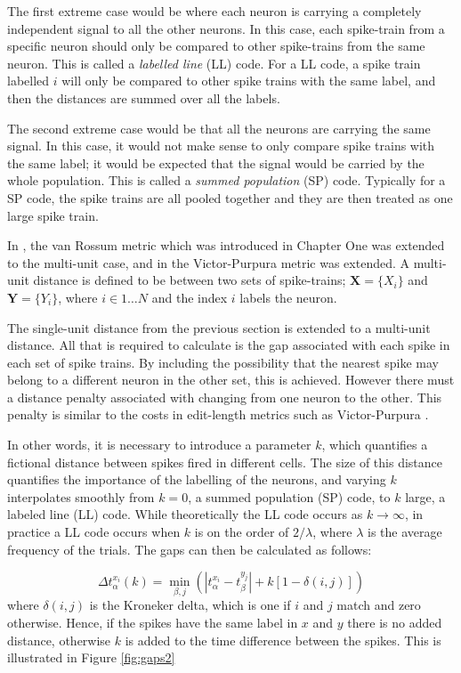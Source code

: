 The first extreme case would be where each neuron is carrying a completely independent signal to all the other neurons.  In this case, each spike-train from a specific neuron should only be compared to other spike-trains from the same neuron.  This is called a \emph{labelled line} (LL) code.  For a LL code, a spike train labelled $i$ will only be compared to other spike trains with the same label, and then the distances are summed over all the labels.

The second extreme case would be that all the neurons are carrying the same signal.  In this case, it would not make sense to only compare spike trains with the same label; it would be expected that the signal would be carried by the whole population.  This is called a \emph{summed population} (SP) code.  Typically for a SP code, the spike trains are all pooled together and they are then treated as one large spike train.

In \citep{HoughtonSen2008a}, the van Rossum metric which was introduced in Chapter One was extended to the multi-unit case, and in \citep{Aronovetal2003a} the Victor-Purpura metric was extended.  A multi-unit distance is defined to be between two sets of spike-trains; $\mathbf{X}=\{ X_i \}$ and $ \mathbf{Y}=\{ Y_i \}$, where $i \in 1\ldots N$ and the index $i$ labels the neuron.

The single-unit distance from the previous section is extended to a multi-unit distance. All that is required to calculate is the gap associated with each spike in each set of spike trains. By including the possibility that the nearest spike may belong to a different neuron in the other set, this is achieved. However there must a distance penalty associated with changing from one neuron to the other. This penalty is similar to the costs in edit-length metrics such as Victor-Purpura \citep{VictorPurpura1997a}. 

In other words, it is necessary to introduce a parameter $k$, which quantifies a fictional distance between spikes fired in different cells.  The size of this distance quantifies the importance of the labelling of the neurons, and varying $k$ interpolates smoothly from $k=0$, a summed population (SP) code, to $k$ large, a labeled line  (LL) code.  While theoretically the LL code occurs as $k \rightarrow \infty$, in practice a LL code occurs when $k$ is on the order of $2/\lambda$, where $\lambda$ is the average frequency of the trials.   The gaps can then be calculated as follows:

\begin{equation}\label{initspike}
\Delta t_{\alpha}^{x_i}(k) = \min_{\beta,j} \left( |t_{\alpha}^{x_i} - t_{\beta}^{y_j} | + k\left[1-\delta(i,j)\right] \right)
\end{equation}
where $\delta(i,j)$ is the Kroneker delta, which is one if $i$ and $j$ match and zero otherwise. Hence, if the spikes have the same label in $x$ and $y$ there is no added distance, otherwise $k$ is added to the time difference between the spikes.  This is illustrated in Figure \ref{fig:gaps2}

